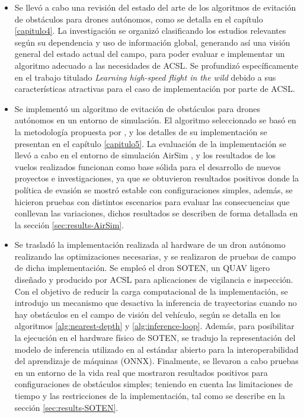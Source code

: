 \begin{itemize}
\item{
    Se llevó a cabo una revisión del estado del arte de los algoritmos de evitación de obstáculos para drones autónomos, como se detalla en el capítulo \ref{capitulo4}. La investigación se organizó clasificando los estudios relevantes según su dependencia y uso de información global, generando así una visión general del estado actual del campo, para poder evaluar e implementar un algoritmo adecuado a las necesidades de ACSL. Se profundizó específicamente en el trabajo titulado \textit{Learning high-speed flight in the wild} \cite{Loquercio2021} debido a sus características atractivas para el caso de implementación por parte de ACSL.
}

\item{
    Se implementó un algoritmo de evitación de obstáculos para drones autónomos en un entorno de simulación. El algoritmo seleccionado se basó en la metodología propuesta por \cite{Loquercio2021}, y los detalles de su implementación se presentan en el capítulo \ref{capitulo5}. La evaluación de la implementación se llevó a cabo en el entorno de simulación AirSim \cite{shah2018airsim}, y los resultados de los vuelos realizados funcionan como base sólida para el desarrollo de nuevos proyectos e investigaciones, ya que se obtuvieron resultados positivos donde la política de evasión se mostró estable con configuraciones simples, además, se hicieron pruebas con distintos escenarios para evaluar las consecuencias que conllevan las variaciones, dichos resultados se describen de forma detallada en la sección \ref{sec:results-AirSim}.
}

\item{
    Se trasladó la implementación realizada al hardware de un dron autónomo realizando las optimizaciones necesarias, y se realizaron de pruebas de campo de dicha implementación. Se empleó el dron SOTEN, un QUAV ligero diseñado y producido por ACSL para aplicaciones de vigilancia e inspección. Con el objetivo de reducir la carga computacional de la implementación, se introdujo un mecanismo que desactiva la inferencia de trayectorias cuando no hay obstáculos en el campo de visión del vehículo, según se detalla en los algoritmos \ref{alg:nearest-depth} y \ref{alg:inference-loop}. Además, para posibilitar la ejecución en el hardware físico de SOTEN, se tradujo la representación del modelo de inferencia utilizado en \cite{Loquercio2021} al estándar abierto para la interoperabilidad del aprendizaje de máquinas (ONNX). Finalmente, se llevaron a cabo pruebas en un entorno de la vida real  que mostraron resultados positivos para configuraciones de obstáculos simples; teniendo en cuenta las limitaciones de tiempo y las restricciones de la implementación, tal como se describe en la sección \ref{sec:results-SOTEN}.
}
\end{itemize}


